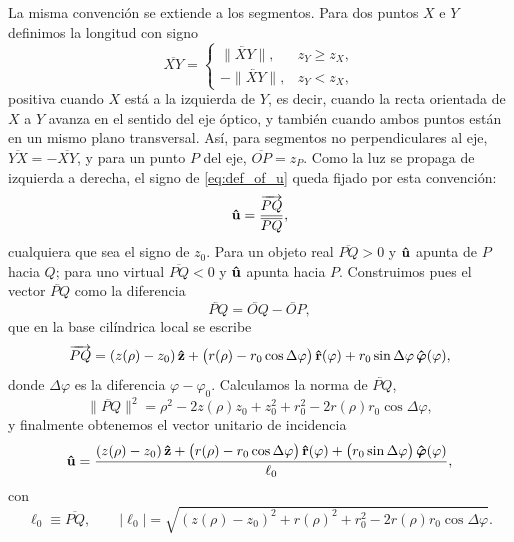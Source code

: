 La misma convención se extiende a los segmentos. Para dos puntos $X$ e $Y$
definimos la longitud con signo
\begin{equation}
  \overline{XY}=
  \begin{cases}
    \lVert\lvec{XY}\rVert, & z_Y\ge z_X,\\[2pt]
    -\lVert\lvec{XY}\rVert, & z_Y< z_X,
  \end{cases}
  \label{eq:signed_segment_def}
\end{equation}
positiva cuando $X$ está a la izquierda de $Y$, es decir, cuando la recta
orientada de $X$ a $Y$ avanza en el sentido del eje óptico, y también cuando
ambos puntos están en un mismo plano transversal. Así, para segmentos no
perpendiculares al eje, $\overline{YX}=-\overline{XY}$, y para un punto $P$ del
eje, $\overline{OP}=z_P$. Como la luz se propaga de izquierda a derecha, el signo
de \eqref{eq:def_of_u} queda fijado por esta convención:
\begin{equation}
  \bm{\hat{\mathbf{u}}}=\frac{\overrightarrow{PQ}}{\overline{PQ}} ,
  \label{eq:u_signed_segment}
\end{equation}
cualquiera que sea el signo de $z_0$. Para un objeto real $\overline{PQ}>0$ y
$\bm{\hat{\mathbf{u}}}$ apunta de $P$ hacia $Q$; para uno virtual $\overline{PQ}<0$ y
$\bm{\hat{\mathbf{u}}}$ apunta hacia $P$.
Construimos pues el vector $\lvec{PQ}$ como la diferencia
\begin{equation}
  \lvec{PQ} = \lvec{OQ} - \lvec{OP},
\end{equation}
que en la base cilíndrica local se escribe
\begin{equation}
 \overrightarrow{PQ} = (z(\rho) - z_0)\,\bm{\hat{\mathbf{z}}}
+ \bigl(r(\rho) - r_0 \cos\Delta\varphi\bigr)\,\bm{\hat{\mathbf{r}}}(\varphi)
+ r_0 \sin\Delta\varphi\,\bm{\hat{\mathbf{\varphi}}}(\varphi),
  \label{eq:explicit_PQ}
\end{equation}
donde $\Delta \varphi$ es la diferencia $\varphi - \varphi_0$.
Calculamos la norma de $\lvec{PQ}$,
\begin{equation}
  \lVert \lvec{PQ} \rVert^2
= \rho^2 - 2 z(\rho) z_0 + z_0^2
+ r_0^2 - 2 r(\rho) r_0 \cos\Delta\varphi,
\end{equation}
y finalmente obtenemos el vector unitario de incidencia
\begin{equation}
   \bm{\hat{\mathbf{u}}}
  =
  \frac{
  (z(\rho) - z_0)\,\bm{\hat{\mathbf{z}}}
  + \bigl(r(\rho) - r_0 \cos\Delta\varphi\bigr)\,\bm{\hat{\mathbf{r}}}(\varphi)
  + \bigl(r_0 \sin\Delta\varphi\bigr)\,\bm{\hat{\mathbf{\varphi}}}(\varphi)
  }{
  \ell_0
  },
  \label{eq:u_for_any_P}
\end{equation}
con
\begin{equation*}
  \ell_0\equiv\overline{PQ},\qquad |\ell_0|=\sqrt{(z(\rho) - z_0)^2 + r(\rho)^2 + r_0^2 - 2 r(\rho) r_0 \cos\Delta\varphi}.
\end{equation*}
